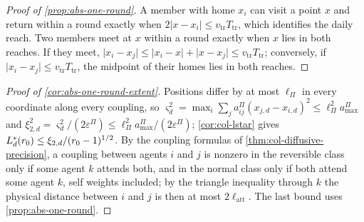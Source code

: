 \begin{proof}[Proof of \cref{prop:abs-one-round}]
A member with home $x_i$ can visit a point $x$ and return within a round exactly when $2\lvert x-x_i\rvert\le v_{\mathrm{tr}}T_{\mathrm{tr}}$, which identifies the daily reach. Two members meet at $x$ within a round exactly when $x$ lies in both reaches. If they meet, $\lvert x_i-x_j\rvert\le\lvert x_i-x\rvert+\lvert x-x_j\rvert\le v_{\mathrm{tr}}T_{\mathrm{tr}}$; conversely, if $\lvert x_i-x_j\rvert\le v_{\mathrm{tr}}T_{\mathrm{tr}}$, the midpoint of their homes lies in both reaches.
\end{proof}

\begin{proof}[Proof of \cref{cor:abs-one-round-extent}]
Positions differ by at most $\ell_\Pi$ in every coordinate along every coupling, so $\varsigma_d^2=\max_i\sum_ja^\Pi_{ij}(x_{j,d}-x_{i,d})^2\le\ell_\Pi^2a^\Pi_{\max}$ and $\xi_{2,d}^2=\varsigma_d^2/(2\varepsilon^\Pi)\le\ell_\Pi^2a^\Pi_{\max}/(2\varepsilon^\Pi)$; \cref{cor:col-lstar} gives $L^{\ast}_d(r_0)\le\xi_{2,d}/(r_0-1)^{1/2}$. By the coupling formulas of \cref{thm:col-diffusive-precision}, a coupling between agents $i$ and $j$ is nonzero in the reversible class only if some agent $k$ attends both, and in the normal class only if both attend some agent $k$, self weights included; by the triangle inequality through $k$ the physical distance between $i$ and $j$ is then at most $2\ell_{\mathrm{att}}$. The last bound uses \cref{prop:abs-one-round}.
\end{proof}

